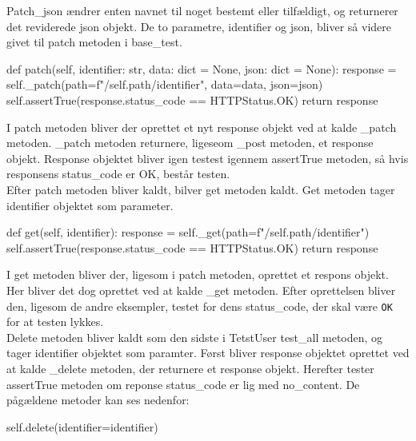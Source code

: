 Patch\_json ændrer enten navnet til noget bestemt eller tilfældigt, og returnerer det reviderede json objekt. De to parametre, identifier og json, bliver så videre givet til patch metoden i base\_test.\\

\begin{code}[language=python, caption=BestTestCase.py, firstnumber=70]
def patch(self, identifier: str, data: dict = None, json: dict = None):
    response = self._patch(path=f"/{self.path}/{identifier}", data=data, json=json)
    self.assertTrue(response.status_code == HTTPStatus.OK)
    return response
\end{code}

I patch metoden bliver der oprettet et nyt response objekt ved at kalde \_patch metoden. \_patch metoden returnere, ligeseom \_post metoden, et response objekt. Response objektet bliver igen testest igennem assertTrue metoden, så hvis responsens status\_code er OK, består testen.\\

Efter patch metoden bliver kaldt, bilver get metoden kaldt. Get metoden tager identifier objektet som parameter. \\

\begin{code}[language=python, caption=BestTestCase.py, firstnumber=60]
def get(self, identifier):
    response = self._get(path=f"/{self.path}/{identifier}")
    self.assertTrue(response.status_code == HTTPStatus.OK)
    return response
\end{code}

I get metoden bliver der, ligesom i patch metoden, oprettet et respons objekt. Her bliver det dog oprettet ved at kalde \_get metoden. Efter oprettelsen bliver den, ligesom de andre eksempler, testet for dens status\_code, der skal være \texttt{OK} for at testen lykkes.\\

Delete metoden bliver kaldt som den sidste i TetstUser test\_all metoden, og tager identifier objektet som paramter. Først bliver response objektet oprettet ved at kalde \_delete metoden, der returnere et response objekt. Herefter tester assertTrue metoden om reponse status\_code er lig med no\_content. De pågældene metoder kan ses nedenfor: \\

\begin{code}[language=python, caption=UsersTest.py, firstnumber=17]
self.delete(identifier=identifier)
\end{code}

